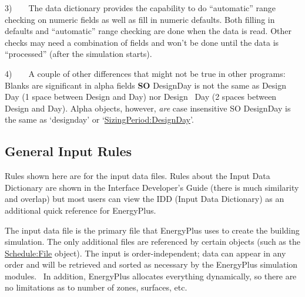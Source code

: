 3)~~~~The data dictionary provides the capability to do ``automatic'' range checking on numeric fields as well as fill in numeric defaults. Both filling in defaults and ``automatic'' range checking are done when the data is read. Other checks may need a combination of fields and won't be done until the data is ``processed'' (after the simulation starts).

4)~~~~A couple of other differences that might not be true in other programs:~ Blanks are significant in alpha fields \textbf{SO} DesignDay is not the same as Design Day (1 space between Design and Day) nor Design~ Day (2 spaces between Design and Day). Alpha objects, however, \emph{are} case insensitive SO DesignDay is the same as `designday' or `\hyperref[sizingperioddesignday]{SizingPeriod:DesignDay}'.

\subsection{General Input Rules}\label{general-input-rules}

Rules shown here are for the input data files. Rules about the Input Data Dictionary are shown in the Interface Developer's Guide (there is much similarity and overlap) but most users can view the IDD (Input Data Dictionary) as an additional quick reference for EnergyPlus.

The input data file is the primary file that EnergyPlus uses to create the building simulation. The only additional files are referenced by certain objects (such as the \hyperref[schedulefile]{Schedule:File} object). The input is order-independent; data can appear in any order and will be retrieved and sorted as necessary by the EnergyPlus simulation modules.~ In addition, EnergyPlus allocates everything dynamically, so there are no limitations as to number of zones, surfaces, etc.

